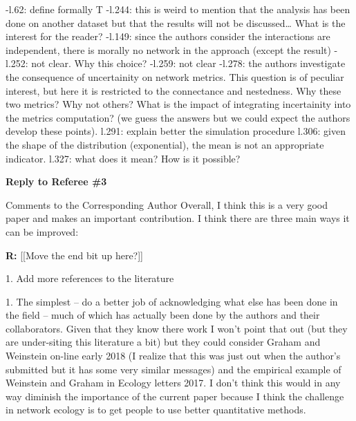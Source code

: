 \documentclass[12pt]{letter}
\newenvironment{refquote}{\bigskip \begin{it}}{\end{it}\smallskip}
\begin{document}
	-l.62: define formally T
	-l.244: this is weird to mention that the analysis has been done on another dataset but that the results will not be discussed… What is the interest for the reader?
	-l.149: since the authors consider the interactions are independent, there is morally no network in the approach (except the result)
	-l.252: not clear. Why this choice?
	-l.259: not clear
	-l.278: the authors investigate the consequence of uncertainity on network metrics. This question is of peculiar interest, but here it is restricted to the connectance and nestedness. Why these two metrics? Why not others? What is the impact of integrating incertainity into the metrics computation? (we guess the answers but we could expect the authors develop these points).
	l.291: explain better the simulation procedure
	l.306: given the shape of the distribution (exponential), the mean is not an appropriate indicator.
	l.327: what does it mean? How is it possible?


{\Large \bf Reply to Referee \#3}

	\begin{refquote}
	Comments to the Corresponding Author
	Overall, I think this is a very good paper and makes an important contribution.  I think there are three main ways it can be improved:
	\end{refquote}

	\textbf{R:} [[Move the end bit up here?]]

	1. Add more references to the literature

	\begin{refquote}
	1.      The simplest – do a better job of acknowledging what else has been done in the field – much of which has actually been done by the authors and their collaborators.  Given that they know there work I won’t point that out (but they are under-siting this literature a bit) but they could consider Graham and Weinstein on-line early 2018 (I realize that this was just out when the author’s submitted but it has some very similar messages) and the empirical example of Weinstein and Graham in Ecology letters 2017.  I don’t think this would in any way diminish the importance of the current paper because I think the challenge in network ecology is to get people to use better quantitative methods.
	\end{refquote}
\end{document}
